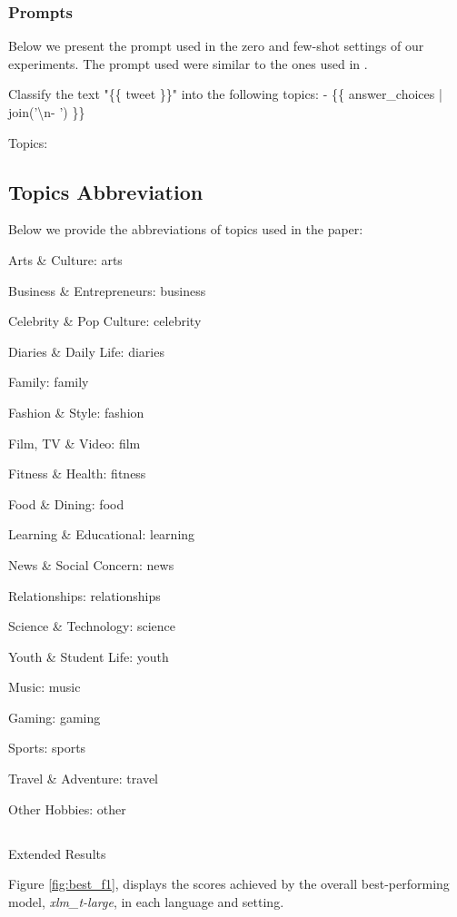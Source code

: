 \subsubsection{Prompts}
\label{appendix:XTopic-prompts}
Below we present the prompt used in the zero and few-shot settings of our experiments. The prompt used were similar to the ones used in \citet{muennighoff2022crosslingual}.



\noindent Classify the text "\{\{ tweet \}\}" into the following topics:
- \{\{ answer\_choices | join('\textbackslash n- ') \}\}

\noindent Topics:

\subsection{Topics Abbreviation}
\label{appendix:XTopic-topic_abbreviations}
Below we provide the abbreviations of topics used in the paper:

Arts \& Culture: arts

Business \& Entrepreneurs: business

Celebrity \& Pop Culture: celebrity

Diaries \& Daily Life: diaries

Family: family

Fashion \& Style: fashion

Film, TV \& Video: film

Fitness \& Health: fitness

Food \& Dining: food

Learning \& Educational: learning

News \& Social Concern: news

Relationships: relationships

Science \& Technology: science

Youth \& Student Life: youth

Music: music

Gaming: gaming

Sports: sports

Travel \& Adventure: travel

Other Hobbies: other


\subsection{}{Extended Results}
\label{appendix:XTopic-results}

Figure \ref{fig:best_f1}, displays the scores achieved by the overall best-performing model, \textit{xlm\_t-large}, in each language and setting.

